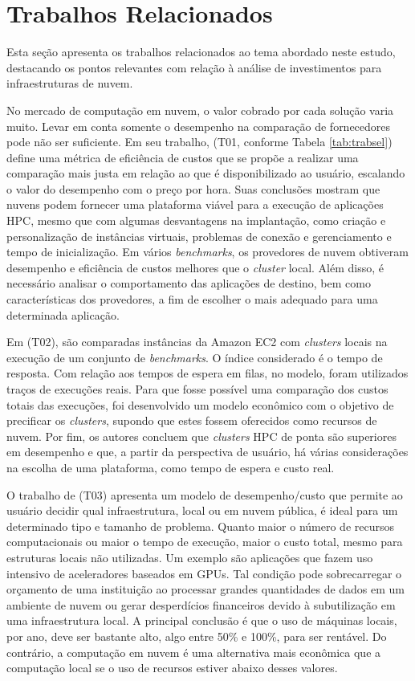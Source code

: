 \documentclass[tese,capa]{texufpel}
\begin{document}
\section{Trabalhos Relacionados}\label{sec:trabrel}

Esta seção apresenta os trabalhos relacionados ao tema abordado neste estudo, destacando os pontos relevantes com relação à análise de investimentos para infraestruturas de nuvem. 

No mercado de computação em nuvem, o valor cobrado por cada solução varia muito. Levar em conta somente o desempenho na comparação de fornecedores pode não ser suficiente. Em seu trabalho, \cite{roloffHighPerformanceComputing2012c} (T01, conforme Tabela \ref{tab:trabsel}) define uma métrica de eficiência de custos que se propõe a realizar uma comparação mais justa em relação ao que é disponibilizado ao usuário, escalando o valor do desempenho com o preço por hora. Suas conclusões mostram que nuvens podem fornecer uma plataforma viável para a execução de aplicações HPC, mesmo que com algumas desvantagens na implantação, como criação e personalização de instâncias virtuais, problemas de conexão e gerenciamento e tempo de inicialização. Em vários \textit{benchmarks}, os provedores de nuvem obtiveram desempenho e eficiência de custos melhores que o \textit{cluster} local. Além disso, é necessário analisar o comportamento das aplicações de destino, bem como características dos provedores, a fim de escolher o mais adequado para uma determinada aplicação.

Em \cite{maratheComparativeStudyHighperformance2013c} (T02), são comparadas instâncias da Amazon EC2 com \textit{clusters} locais na execução de um conjunto de \textit{benchmarks}. O índice considerado é o tempo de resposta. Com relação aos tempos de espera em filas, no modelo, foram utilizados traços de execuções reais. Para que fosse possível uma comparação dos custos totais das execuções, foi desenvolvido um modelo econômico com o objetivo de precificar os \textit{clusters}, supondo que estes fossem oferecidos como recursos de nuvem. Por fim, os autores concluem que \textit{clusters} HPC de ponta são superiores em desempenho e que, a partir da perspectiva de usuário, há várias considerações na escolha de uma plataforma, como tempo de espera e custo real.

O trabalho de \cite{guerreroPerformanceCostModel2014b} (T03) apresenta um modelo de desempenho/custo que permite ao usuário decidir qual infraestrutura, local ou em nuvem pública, é ideal para um determinado tipo e tamanho de problema. Quanto maior o número de recursos computacionais ou maior o tempo de execução, maior o custo total, mesmo para estruturas locais não utilizadas. Um exemplo são aplicações que fazem uso intensivo de aceleradores baseados em GPUs. Tal condição pode sobrecarregar o orçamento de uma instituição ao processar grandes quantidades de dados em um ambiente de nuvem ou gerar desperdícios financeiros devido à subutilização em uma infraestrutura local. A principal conclusão é que o uso de máquinas locais, por ano, deve ser bastante alto, algo entre 50\% e 100\%, para ser rentável. Do contrário, a computação em nuvem é uma alternativa mais econômica que a computação local se o uso de recursos estiver abaixo desses valores. 
\end{document}
